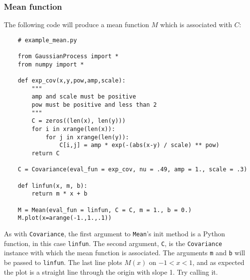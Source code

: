 \documentclass{report}
\begin{document}
\subsubsection{Mean function} 
The following code will produce a mean function $M$ which is associated with $C$:
\begin{small}
\begin{verbatim}
    # example_mean.py
    
    from GaussianProcess import *
    from numpy import *

    def exp_cov(x,y,pow,amp,scale):
        """
        amp and scale must be positive
        pow must be positive and less than 2
        """
        C = zeros((len(x), len(y)))
        for i in xrange(len(x)):
            for j in xrange(len(y)):
                C[i,j] = amp * exp(-(abs(x-y) / scale) ** pow)
        return C

    C = Covariance(eval_fun = exp_cov, nu = .49, amp = 1., scale = .3)

    def linfun(x, m, b):
        return m * x + b

    M = Mean(eval_fun = linfun, C = C, m = 1., b = 0.)
    M.plot(x=arange(-1.,1.,.1))
\end{verbatim}
\end{small}
As with \texttt{Covariance}, the first argument to \texttt{Mean}'s init method is a Python function, in this case \texttt{linfun}. The second argument, \texttt{C}, is the \texttt{Covariance} instance with which the mean function is associated. The arguments \texttt{m} and \texttt{b} will be passed to \texttt{linfun}. The last line plots $M(x)$ on $-1<x<1$, and as expected the plot is a straight line through the origin with slope 1. Try calling it.
\end{document}
